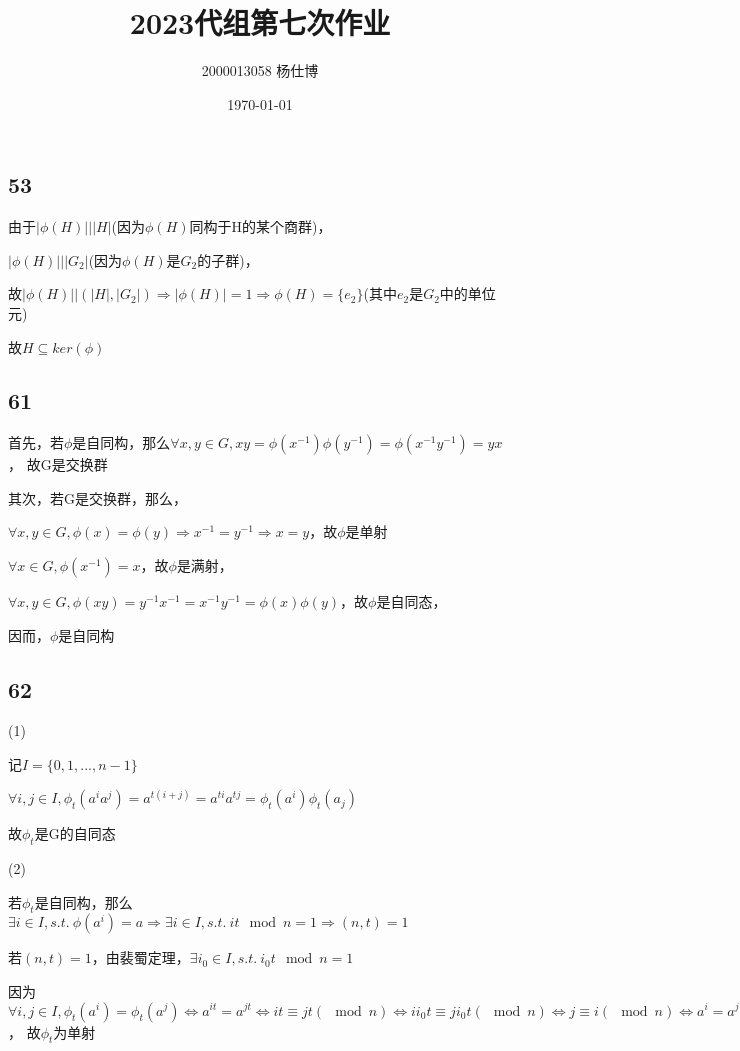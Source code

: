 \documentclass[UTF8]{ctexart}
\title{\vspace{-4cm}2023代组第七次作业}
\author{2000013058 杨仕博}
\date{\today}
\begin{document}
\maketitle

\subsection*{53}

由于$|\phi(H)|\Big||H|$(因为$\phi(H)$同构于H的某个商群)，

$|\phi(H)|\Big||G_2|$(因为$\phi(H)$是$G_2$的子群)，

故$|\phi(H)|\Big|(|H|, |G_2|)\Rightarrow |\phi(H)| = 1\Rightarrow \phi(H) = \{e_2\}$(其中$e_2$是$G_2$中的单位元)

故$H\subseteq ker(\phi)$

\subsection*{61}

首先，若$\phi$是自同构，那么$\forall x, y \in G, xy = \phi(x^{-1})\phi(y^{-1}) = \phi(x^{-1}y^{-1}) = yx$，
故G是交换群

其次，若G是交换群，那么，

$\forall x, y\in G, \phi(x) = \phi(y)\Rightarrow x^{-1} = y^{-1}\Rightarrow x = y$，故$\phi$是单射

$\forall x\in G, \phi(x^{-1}) = x$，故$\phi$是满射，

$\forall x, y\in G, \phi(xy) = y^{-1}x^{-1} = x^{-1}y^{-1} = \phi(x)\phi(y)$，故$\phi$是自同态，

因而，$\phi$是自同构

\subsection*{62}

(1)

记$I = \{0, 1, ..., n-1\}$

$\forall i, j\in I, \phi_t(a^ia^j) = a^{t(i + j)} = a^{ti}a^{tj} = \phi_t(a^i)\phi_t(a_j)$

故$\phi_t$是G的自同态

(2)

若$\phi_t$是自同构，那么$\exists i\in I, s.t.\ \phi(a^i) = a\Rightarrow \exists i\in I, s.t.\ it\mod n = 1\Rightarrow (n, t) = 1$

若$(n, t) = 1$，由裴蜀定理，$\exists i_0\in I, s.t.\ i_0t\mod n = 1$

因为$\forall i, j\in I, \phi_t(a^i) = \phi_t(a^j)\Leftrightarrow a^{it} = a^{jt}\Leftrightarrow it\equiv jt(\mod n)\Leftrightarrow ii_0t\equiv ji_0t(\mod n)\Leftrightarrow j\equiv i(\mod n)\Leftrightarrow a^i = a^j$，
故$\phi_t$为单射
\end{document}
